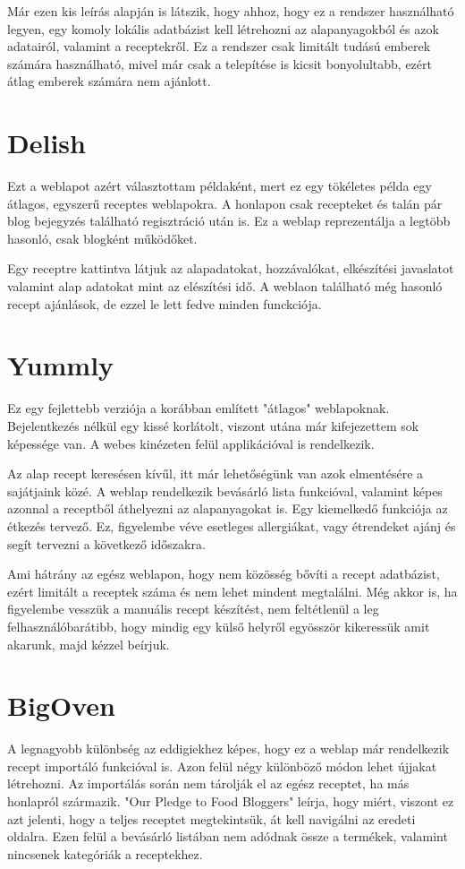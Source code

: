 \documentclass[12pt]{report}
\theoremstyle{definition}
\begin{document}
Már ezen kis leírás alapján is látszik, hogy ahhoz, hogy ez a rendszer használható legyen, egy komoly lokális adatbázist kell létrehozni az alapanyagokból és azok adatairól, valamint a receptekről. Ez a rendszer csak limitált tudású emberek számára használható, mivel már csak a telepítése is kicsit bonyolultabb, ezért átlag emberek számára nem ajánlott.

\section{Delish}
Ezt a weblapot azért választottam példaként, mert ez egy tökéletes példa egy átlagos, egyszerű receptes weblapokra.  A honlapon csak recepteket és talán pár blog bejegyzés található regisztráció után is. Ez a weblap reprezentálja a legtöbb hasonló, csak blogként működőket.

Egy receptre kattintva látjuk az alapadatokat, hozzávalókat, elkészítési javaslatot valamint alap adatokat mint az elészítési idő. A weblaon található még hasonló recept ajánlások, de ezzel le lett fedve minden funckciója.

\section{Yummly}
Ez egy fejlettebb verziója a korábban említett "átlagos" weblapoknak. Bejelentkezés nélkül egy kissé korlátolt, viszont utána már kifejezettem sok képessége van. A webes kinézeten felül applikációval is rendelkezik.

Az alap recept keresésen kívűl, itt már lehetőségünk van azok elmentésére a sajátjaink közé. A weblap rendelkezik bevásárló lista funkcióval, valamint képes azonnal a receptből áthelyezni az alapanyagokat is. Egy kiemelkedő funkciója az étkezés tervező. Ez, figyelembe véve esetleges allergiákat, vagy étrendeket ajánj és segít tervezni a következő időszakra.

Ami hátrány az egész weblapon, hogy nem közösség bővíti a recept adatbázist, ezért limitált a receptek száma és nem lehet mindent megtalálni. Még akkor is, ha figyelembe vesszük a manuális recept készítést, nem feltétlenül a leg felhasználóbarátibb, hogy mindig egy külső helyről egyösször kikeressük amit akarunk, majd kézzel beírjuk.

\section{BigOven}
A legnagyobb különbség az eddigiekhez képes, hogy ez a weblap már rendelkezik recept importáló funkcióval is. Azon felül négy különböző módon lehet újjakat létrehozni. Az importálás során nem tárolják el az egész receptet, ha más honlapról származik. "Our Pledge to Food Bloggers" leírja, hogy miért, viszont ez azt jelenti, hogy a teljes receptet megtekintsük, át kell navigálni az eredeti oldalra. Ezen felül a bevásárló listában nem adódnak össze a termékek, valamint nincsenek kategóriák a receptekhez.
\end{document}
